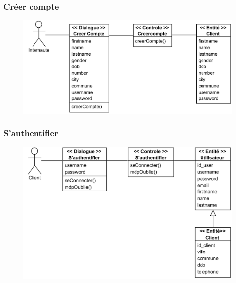         \subsubsection[Créer compte]{Créer compte}
            \begin{figure}[H]
                \centering
                \includegraphics[width=130mm]{images/diagrammes-de-classes-participantes/creer-compte Class Diagram.png}
                \label{fig:cpCreerCpt}
            \end{figure}
        \subsubsection[S’authentifier]{S’authentifier}
            \begin{figure}[H]
                \centering
                \includegraphics[width=130mm]{images/diagrammes-de-classes-participantes/authentifier Class Diagram.png}
                \label{fig:cpSauth}
            \end{figure}
